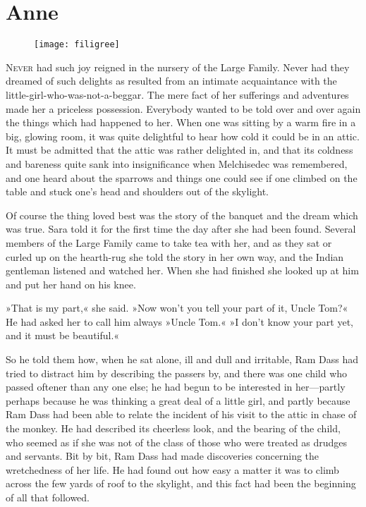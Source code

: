 \chapter{Anne}

\begin{figure}[t!]
\centering
\texttt{[image: filigree]}
\end{figure}

\lettrine[lines=5]{N}{ever} had such joy reigned in the nursery of the Large Family. Never had they dreamed of such delights as resulted from an intimate acquaintance with the little-girl-who-was-not-a-beggar. The mere fact of her sufferings and adventures made her a priceless possession. Everybody wanted to be told over and over again the things which had happened to her. When one was sitting by a warm fire in a big, glowing room, it was quite delightful to hear how cold it could be in an attic. It must be admitted that the attic was rather delighted in, and that its coldness and bareness quite sank into insignificance when Melchisedec was remembered, and one heard about the sparrows and things one could see if one climbed on the table and stuck one's head and shoulders out of the skylight.

Of course the thing loved best was the story of the banquet and the dream which was true. Sara told it for the first time the day after she had been found. Several members of the Large Family came to take tea with her, and as they sat or curled up on the hearth-rug she told the story in her own way, and the Indian gentleman listened and watched her. When she had finished she looked up at him and put her hand on his knee.

»That is my part,« she said. »Now won't you tell your part of it, Uncle Tom?« He had asked her to call him always »Uncle Tom.« »I don't know your part yet, and it must be beautiful.«

So he told them how, when he sat alone, ill and dull and irritable, Ram Dass had tried to distract him by describing the passers by, and there was one child who passed oftener than any one else; he had begun to be interested in her—partly perhaps because he was thinking a great deal of a little girl, and partly because Ram Dass had been able to relate the incident of his visit to the attic in chase of the monkey. He had described its cheerless look, and the bearing of the child, who seemed as if she was not of the class of those who were treated as drudges and servants. Bit by bit, Ram Dass had made discoveries concerning the wretchedness of her life. He had found out how easy a matter it was to climb across the few yards of roof to the skylight, and this fact had been the beginning of all that followed.

